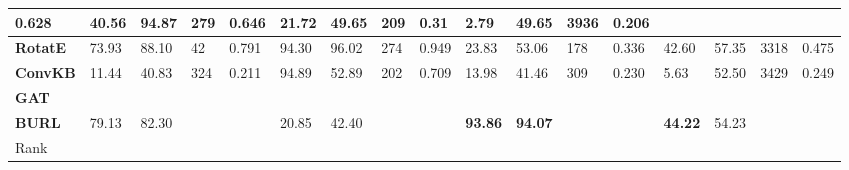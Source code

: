 \begin{table}[ht]
{\begin{tabular}{lllllllllllllllll}
  \multicolumn{1}{l|}{0.628} &
  \multicolumn{1}{l|}{40.56} &
  \multicolumn{1}{l|}{94.87} &
  \multicolumn{1}{l|}{279} &
  \multicolumn{1}{l|}{0.646} &
  \multicolumn{1}{l|}{21.72} &
  \multicolumn{1}{l|}{49.65} &
  \multicolumn{1}{l|}{209} &
  \multicolumn{1}{l|}{0.31} &
  \multicolumn{1}{l|}{2.79} &
  \multicolumn{1}{l|}{49.65} &
  \multicolumn{1}{l|}{3936} &
  \multicolumn{1}{l|}{0.206} \\ \hline
\multicolumn{1}{|l|}{\textbf{RotatE}} &
  \multicolumn{1}{l|}{73.93} &
  \multicolumn{1}{l|}{88.10} &
  \multicolumn{1}{l|}{42} &
  \multicolumn{1}{l|}{0.791} &
  \multicolumn{1}{l|}{94.30} &
  \multicolumn{1}{l|}{96.02} &
  \multicolumn{1}{l|}{274} &
  \multicolumn{1}{l|}{0.949} &
  \multicolumn{1}{l|}{23.83} &
  \multicolumn{1}{l|}{53.06} &
  \multicolumn{1}{l|}{178} &
  \multicolumn{1}{l|}{0.336} &
  \multicolumn{1}{l|}{42.60} &
  \multicolumn{1}{l|}{57.35} &
  \multicolumn{1}{l|}{3318} &
  \multicolumn{1}{l|}{0.475} \\ \hline
\multicolumn{1}{|l|}{\textbf{ConvKB}} &
  \multicolumn{1}{l|}{11.44} &
  \multicolumn{1}{l|}{40.83} &
  \multicolumn{1}{l|}{324} &
  \multicolumn{1}{l|}{0.211} &
  \multicolumn{1}{l|}{94.89} &
  \multicolumn{1}{l|}{52.89} &
  \multicolumn{1}{l|}{202} &
  \multicolumn{1}{l|}{0.709} &
  \multicolumn{1}{l|}{13.98} &
  \multicolumn{1}{l|}{41.46} &
  \multicolumn{1}{l|}{309} &
  \multicolumn{1}{l|}{0.230} &
  \multicolumn{1}{l|}{5.63} &
  \multicolumn{1}{l|}{52.50} &
  \multicolumn{1}{l|}{3429} &
  \multicolumn{1}{l|}{0.249} \\ \hline
\multicolumn{1}{|l|}{\textbf{GAT}} &
  \multicolumn{1}{l|}{} &
  \multicolumn{1}{l|}{} &
  \multicolumn{1}{l|}{} &
  \multicolumn{1}{l|}{} &
  \multicolumn{1}{l|}{} &
  \multicolumn{1}{l|}{} &
  \multicolumn{1}{l|}{} &
  \multicolumn{1}{l|}{} &
  \multicolumn{1}{l|}{} &
  \multicolumn{1}{l|}{} &
  \multicolumn{1}{l|}{} &
  \multicolumn{1}{l|}{} &
  \multicolumn{1}{l|}{} &
  \multicolumn{1}{l|}{} &
  \multicolumn{1}{l|}{} &
  \multicolumn{1}{l|}{} \\ \hline
\multicolumn{1}{|l|}{\textbf{BURL}} &
  \multicolumn{1}{l|}{79.13} &
  \multicolumn{1}{l|}{82.30} &
  \multicolumn{1}{l|}{} &
  \multicolumn{1}{l|}{} &
  \multicolumn{1}{l|}{20.85} &
  \multicolumn{1}{l|}{42.40} &
  \multicolumn{1}{l|}{} &
  \multicolumn{1}{l|}{} &
  \multicolumn{1}{l|}{\textbf{93.86}} &
  \multicolumn{1}{l|}{\textbf{94.07}} &
  \multicolumn{1}{l|}{} &
  \multicolumn{1}{l|}{} &
  \multicolumn{1}{l|}{\textbf{44.22}} &
  \multicolumn{1}{l|}{54.23} &
  \multicolumn{1}{l|}{} &
  \multicolumn{1}{l|}{} \\ \hline
Rank &
   &
   &
   &
   &
   &
   &
   &
   &
   &
   &
   &
   &
   &
   &
   &

\end{tabular}}
\end{table}


